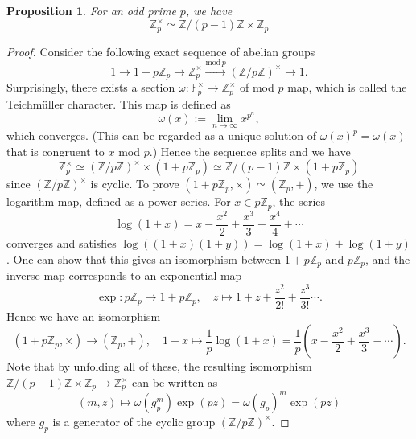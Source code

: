 \documentclass{article}
\newtheorem{proposition}{Proposition}
\begin{document}
\begin{proposition}
For an odd prime $p$, we have 
$$
\mathbb{Z}_{p}^{\times}\simeq \mathbb{Z}/(p-1)\mathbb{Z}\times \mathbb{Z}_{p}
$$
\end{proposition}
\begin{proof}
Consider the following exact sequence of abelian groups
$$
1\to 1+p\mathbb{Z}_{p} \to \mathbb{Z}_{p}^{\times} \xrightarrow{\mathrm{mod}\,p} (\mathbb{Z}/p\mathbb{Z})^{\times} \to 1.
$$
Surprisingly, there exists a section $\omega:\mathbb{F}_{p}^{\times} \to \mathbb{Z}_{p}^{\times}$ of mod $p$ map, which is called the Teichm\"uller character. This map is defined as   
$$
\omega(x):= \lim_{n\to \infty} x^{p^{n}}, 
$$
which converges. 
(This can be regarded as a unique solution of $\omega(x)^{p} = \omega(x)$ that is congruent to $x$ mod $p$.) Hence the sequence splits and we have
$$
\mathbb{Z}_{p}^{\times}\simeq (\mathbb{Z}/p\mathbb{Z})^{\times}\times (1+p\mathbb{Z}_{p}) \simeq \mathbb{Z}/(p-1)\mathbb{Z}\times (1+p\mathbb{Z}_{p})
$$
since $(\mathbb{Z}/p\mathbb{Z})^{\times}$ is cyclic. 
To prove $(1+p\mathbb{Z}_{p}, \times)\simeq (\mathbb{Z}_{p}, +)$, we use the logarithm map, defined as a power series. For $x\in p\mathbb{Z}_{p}$, the series
$$
\log(1+x) = x- \frac{x^{2}}{2} + \frac{x^{3}}{3} - \frac{x^{4}}{4} +\cdots 
$$
converges and satisfies $\log((1+x)(1+y)) = \log(1+x) + \log (1+y)$. One can show that this gives an isomorphism between $1+p\mathbb{Z}_{p}$ and $p\mathbb{Z}_{p}$, and the inverse map corresponds to an exponential map
$$
\exp:p\mathbb{Z}_{p}\to 1+p\mathbb{Z}_{p}, \quad z\mapsto 1+ z+ \frac{z^{2}}{2!} + \frac{z^{3}}{3!} \cdots .
$$
Hence we have an isomorphism 
$$
(1+p\mathbb{Z}_{p}, \times)\to (\mathbb{Z}_{p}, +), \quad 1+x\mapsto \frac{1}{p}\log(1+x) = \frac{1}{p}\left(x-\frac{x^{2}}{2} + \frac{x^{3}}{3}-\cdots\right). 
$$
Note that by unfolding all of these, the resulting isomorphism $\mathbb{Z}/(p-1)\mathbb{Z}\times \mathbb{Z}_{p}\to \mathbb{Z}_{p}^{\times}$ can be written as 
$$
(m, z)\mapsto \omega(g_{p}^{m})\exp(pz) = \omega(g_{p})^{m}\exp(pz)
$$
where $g_{p}$ is a generator of the cyclic group $(\mathbb{Z}/p\mathbb{Z})^{\times}$. 
\end{proof}
\end{document}
